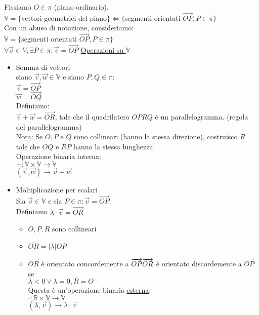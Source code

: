 \documentclass{article}
\newcommand{\ul}[1]{\underline{#1}}
\newcommand{\R}{\mathbb{R}}
\newcommand{\V}{\mathbb{V}}
\begin{document}
\vspace*{1em}
Fissiamo $O\in\pi$ (piano ordinario).\\
$\V=\{$vettori geometrici del piano$\}\Leftrightarrow\{$segmenti orientati $\overrightarrow{OP},P\in\pi\}$\\
Con un abuso di notazione, consideriamo:\\
$\V=\{$segmenti orientati $\overrightarrow{OP},P\in\pi\}$\\
$\forall\overrightarrow{v}\in V,\exists P\in\pi:\overrightarrow{v}=\overrightarrow{OP}$
\ul{Operazioni su $\V$}
\begin{itemize}
	\item Somma di vettori\\
	      siano $\overrightarrow{v},\overrightarrow{w}\in \V$ e siano $P,Q\in\pi:$\\
	      $\overrightarrow{v}=\overrightarrow{OP}$\\
	      $\overrightarrow{w}=\overrightarrow{OQ}$\vspace*{1em}\\
	      Definiamo:\\
	      $\overrightarrow{v}+\overrightarrow{w}=\overrightarrow{OR}$, tale che il quadrilatero $OPRQ$ è un parallelogramma. (regola del parallelogramma)\\
	      \ul{Nota}: Se $O,P$ e $Q$ sono collineari (hanno la stessa direzione), costruisco $R$ tale che $OQ$ e $RP$ hanno la stessa lunghezza\\
	      Operazione binaria interna:\\
	      $+:\V\times\V\rightarrow\V$\\
	      \hspace*{1.9em}$(\overrightarrow{v},\overrightarrow{w})\rightarrow\overrightarrow{v}+\overrightarrow{w}$
	\item Moltiplicazione per scalari\\
	      Sia $\overrightarrow{v}\in\V$ e sia $P\in\pi:\overrightarrow{v}=\overrightarrow{OP}$.\vspace*{1em}\\
	      Definiamo $\lambda\cdot\overrightarrow{v}=\overrightarrow{OR}$
	      \begin{itemize}
		      \item $O,P,R$ sono collineari
		      \item $\overline{OR}=|\lambda|OP$
		      \item $\overrightarrow{OR}$ è orientato concordemente a $\overrightarrow{OP}\\\overrightarrow{OR}$ è orientato discordemente a $\overrightarrow{OP}$ se\\
		            $\lambda<0\vee\lambda=0,R=O$\\
		            Questa è un'operazione binaria \ul{esterna}:\\
		            $\cdot:\R\times\V\rightarrow \V$\\
		            \hspace*{1.5em}$(\lambda,\overrightarrow{v})\rightarrow\lambda\cdot\overrightarrow{v}$
	      \end{itemize}
\end{itemize}
\end{document}
